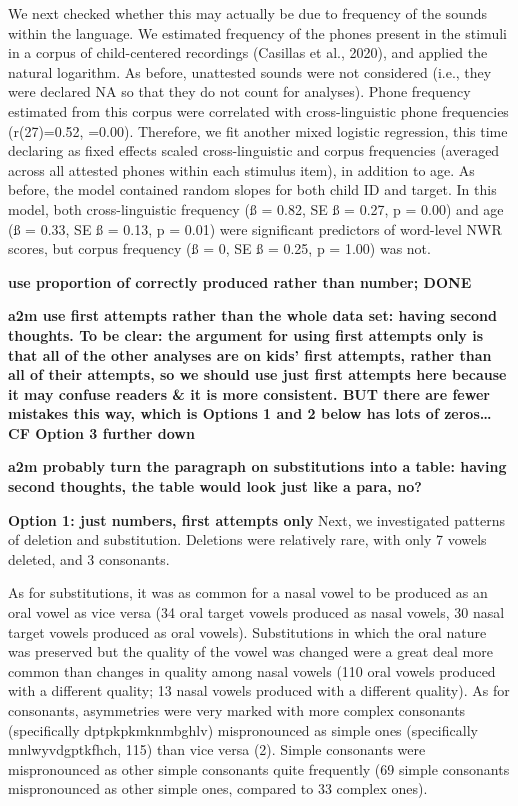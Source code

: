 \documentclass[english,,man,floatsintext]{apa6}
\begin{document}
We next checked whether this may actually be due to frequency of the
sounds within the language. We estimated frequency of the phones present
in the stimuli in a corpus of child-centered recordings (Casillas et
al., 2020), and applied the natural logarithm. As before, unattested
sounds were not considered (i.e., they were declared NA so that they do
not count for analyses). Phone frequency estimated from this corpus were
correlated with cross-linguistic phone frequencies (r(27)=0.52, =0.00).
Therefore, we fit another mixed logistic regression, this time declaring
as fixed effects scaled cross-linguistic and corpus frequencies
(averaged across all attested phones within each stimulus item), in
addition to age. As before, the model contained random slopes for both
child ID and target. In this model, both cross-linguistic frequency (ß =
0.82, SE ß = 0.27, p = 0.00) and age (ß = 0.33, SE ß = 0.13, p = 0.01)
were significant predictors of word-level NWR scores, but corpus
frequency (ß = 0, SE ß = 0.25, p = 1.00) was not.

\textbf{use proportion of correctly produced rather than number; DONE}

\textbf{a2m use first attempts rather than the whole data set: having
second thoughts. To be clear: the argument for using first attempts only
is that all of the other analyses are on kids' first attempts, rather
than all of their attempts, so we should use just first attempts here
because it may confuse readers \& it is more consistent. BUT there are
fewer mistakes this way, which is Options 1 and 2 below has lots of
zeros\ldots{} CF Option 3 further down}

\textbf{a2m probably turn the paragraph on substitutions into a table:
having second thoughts, the table would look just like a para, no?}

\textbf{Option 1: just numbers, first attempts only } Next, we
investigated patterns of deletion and substitution. Deletions were
relatively rare, with only 7 vowels deleted, and 3 consonants.

As for substitutions, it was as common for a nasal vowel to be produced
as an oral vowel as vice versa (34 oral target vowels produced as nasal
vowels, 30 nasal target vowels produced as oral vowels). Substitutions
in which the oral nature was preserved but the quality of the vowel was
changed were a great deal more common than changes in quality among
nasal vowels (110 oral vowels produced with a different quality; 13
nasal vowels produced with a different quality). As for consonants,
asymmetries were very marked with more complex consonants (specifically
dptpkpkmknmbghlv) mispronounced as simple ones (specifically
mnlwyvdgptkfhch, 115) than vice versa (2). Simple consonants were
mispronounced as other simple consonants quite frequently (69 simple
consonants mispronounced as other simple ones, compared to 33 complex
ones).
\end{document}
